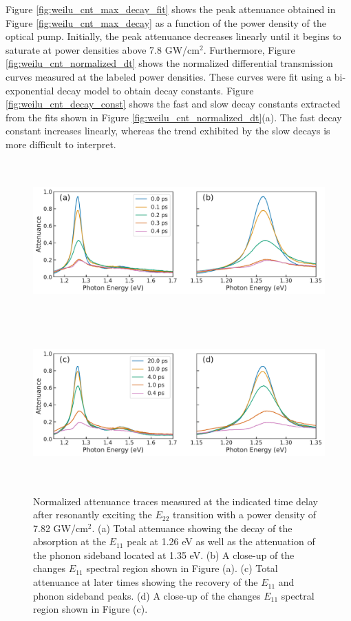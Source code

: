 Figure \ref{fig:weilu_cnt_max_decay_fit} shows the peak attenuance obtained in Figure \ref{fig:weilu_cnt_max_decay} as a function of the power density of the optical pump. Initially, the peak attenuance decreases linearly until it begins to saturate at power densities above 7.8 GW/cm$^2$. Furthermore, Figure \ref{fig:weilu_cnt_normalized_dt} shows the normalized differential transmission curves measured at the labeled power densities. These curves were fit using a bi-exponential decay model to obtain decay constants. Figure \ref{fig:weilu_cnt_decay_const} shows the fast and slow decay constants extracted from the fits shown in Figure \ref{fig:weilu_cnt_normalized_dt}(a). The fast decay constant increases linearly, whereas the trend exhibited by the slow decays is more difficult to interpret.

\begin{figure}[H]
	\centering
	{\includegraphics[height=2.4in]{images/chapter_my_data/Weilu_CNT_4mW_E11_decay} }
	{\includegraphics[height=2.4in]{images/chapter_my_data/Weilu_CNT_4mW_E11_recovery} }
	\caption{Normalized attenuance traces measured at the indicated time delay after resonantly exciting the $E_{22}$ transition with a power density of 7.82 GW/cm$^2$. (a) Total attenuance showing the decay of the absorption at the $E_{11}$ peak at 1.26 eV as well as the attenuation of the phonon sideband located at 1.35 eV. (b) A close-up of the changes $E_{11}$ spectral region shown in Figure (a). (c) Total attenuance at later times showing the recovery of the $E_{11}$ and phonon sideband peaks. (d) A close-up of the changes $E_{11}$ spectral region shown in Figure (c).}
	\label{fig:weilu_cnt_time_traces}
\end{figure}

